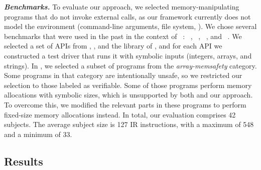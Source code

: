 \textbf{\textit{Benchmarks.}}
To evaluate our approach,
we selected memory-manipulating programs that do not invoke external calls,
as our framework currently does not model the environment (command-line arguments, file system, \etc).
We chose several benchmarks that were used in the past in the context of \SE~\cite{klee,symsize-model,compact-s-e,klee-rocq}:
\libtasn~\cite{libtasn1}, \libosip~\cite{libosip}, \coreutils~\cite{coreutils-misc}, and \svcomp~\cite{svcomp}.
We selected a set of APIs from \libtasn, \libosip, and the library of \coreutils,
and for each API we constructed a test driver that runs it with symbolic inputs (\eg integers, arrays, and strings).
In \svcomp, we selected a subset of programs from the \textit{array-memsafety} category.
Some programs in that category are intentionally unsafe,
so we restricted our selection to those labeled as verifiable.
Some of those programs perform memory allocations with symbolic sizes,
which is unsupported by both \klee and our approach.
To overcome this, we modified the relevant parts in these programs to perform fixed-size memory allocations instead.
In total, our evaluation comprises 42 subjects.
The average subject size is 127 \llvm IR instructions, with a maximum of 548 and a minimum of 33.

\subsection{Results}


